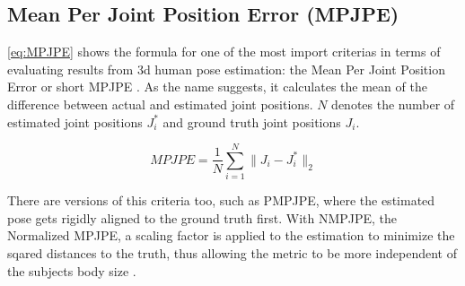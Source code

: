 \subsection{Mean Per Joint Position Error (MPJPE)}
\label{criteria:mpjpe}
\autoref{eq:MPJPE} shows the formula for one of the most import criterias in terms of evaluating results from 3d human pose estimation: the Mean Per Joint Position Error or short MPJPE \cite{Zheng2020}. As the name suggests, it calculates the mean of the difference between actual and estimated joint positions. $N$ denotes the number of estimated joint positions $J_{i}^*$ and ground truth joint positions $J_{i}$. 

\begin{equation}
\label{eq:MPJPE}
MPJPE = \frac{1}{N} \sum_{i=1}^{N} \lVert J_{i} - J_{i}^*\rVert_{2}
\end{equation}

There are versions of this criteria too, such as PMPJPE, where the estimated pose gets rigidly aligned to the ground truth first.
With NMPJPE, the Normalized MPJPE, a scaling factor is applied to the estimation to minimize the sqared distances to the truth, thus allowing the metric to be more independent of the subjects body size \cite{Rhodin2018}.